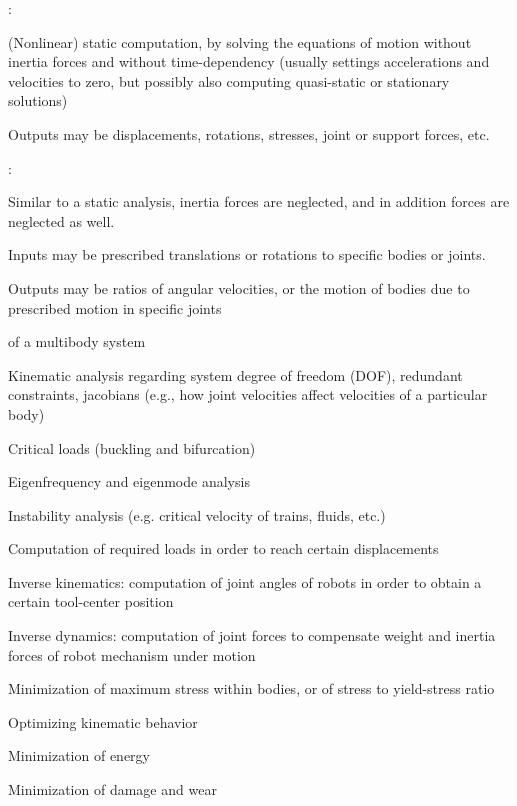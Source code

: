 \noindent {}:
\bi
  \item (Nonlinear) static computation, by solving the equations of motion without inertia forces and without time-dependency (usually settings accelerations and velocities to zero, but possibly also computing quasi-static or stationary solutions)
  \item Outputs may be displacements, rotations, stresses, joint or support forces, etc.
\ei

\noindent {}: 
\bi
  \item Similar to a static analysis, inertia forces are neglected, and in addition forces are neglected as well.
  \item Inputs may be prescribed translations or rotations to specific bodies or joints.
  \item Outputs may be ratios of angular velocities, or the motion of bodies due to prescribed motion in specific joints
\ei

\noindent {} of a multibody system
\bi
  \item Kinematic analysis regarding system degree of freedom (\ac{DOF}), redundant constraints, jacobians (e.g., how joint velocities affect velocities of a particular body)
  \item Critical loads (buckling and bifurcation)
  \item Eigenfrequency and eigenmode analysis
  \item Instability analysis (e.g. critical velocity of trains, fluids, etc.)
\ei

\noindent {}
\bi
  \item Computation of required loads in order to reach certain displacements
  \item Inverse kinematics: computation of joint angles of robots in order to obtain a certain tool-center position
  \item Inverse dynamics: computation of joint forces to compensate weight and inertia forces of robot mechanism under motion
\ei 

\noindent {}
\bi
  \item Minimization of maximum stress within bodies, or of stress to yield-stress ratio
  \item Optimizing kinematic behavior
  \item Minimization of energy
  \item Minimization of damage and wear
\ei

